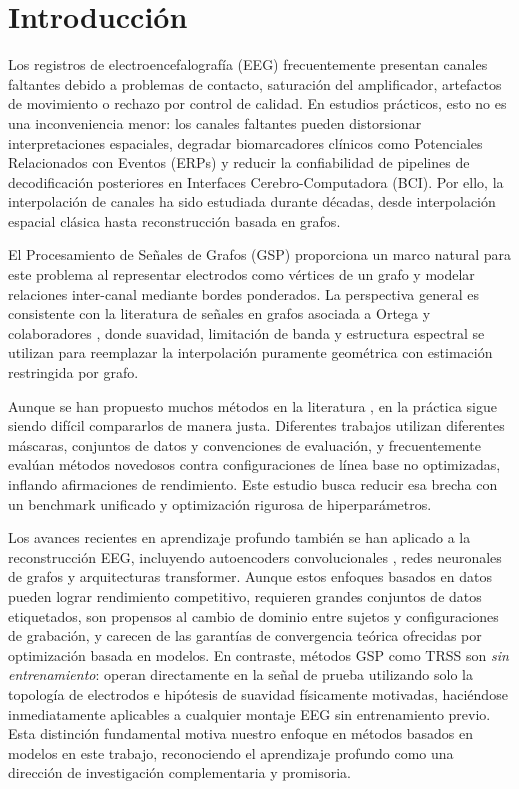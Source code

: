 \section{Introducción}

Los registros de electroencefalografía (EEG) frecuentemente presentan canales faltantes debido a problemas de contacto, saturación del amplificador, artefactos de movimiento o rechazo por control de calidad. En estudios prácticos, esto no es una inconveniencia menor: los canales faltantes pueden distorsionar interpretaciones espaciales, degradar biomarcadores clínicos como Potenciales Relacionados con Eventos (ERPs) y reducir la confiabilidad de pipelines de decodificación posteriores en Interfaces Cerebro-Computadora (BCI). Por ello, la interpolación de canales ha sido estudiada durante décadas, desde interpolación espacial clásica hasta reconstrucción basada en grafos.

El Procesamiento de Señales de Grafos (GSP) proporciona un marco natural para este problema al representar electrodos como vértices de un grafo y modelar relaciones inter-canal mediante bordes ponderados. La perspectiva general es consistente con la literatura de señales en grafos asociada a Ortega y colaboradores \cite{shuman2013,ortega2018}, donde suavidad, limitación de banda y estructura espectral se utilizan para reemplazar la interpolación puramente geométrica con estimación restringida por grafo.

Aunque se han propuesto muchos métodos en la literatura \cite{narang2013,puy2018,zhang2024bgsrp}, en la práctica sigue siendo difícil compararlos de manera justa. Diferentes trabajos utilizan diferentes máscaras, conjuntos de datos y convenciones de evaluación, y frecuentemente evalúan métodos novedosos contra configuraciones de línea base no optimizadas, inflando afirmaciones de rendimiento. Este estudio busca reducir esa brecha con un benchmark unificado y optimización rigurosa de hiperparámetros.

Los avances recientes en aprendizaje profundo también se han aplicado a la reconstrucción EEG, incluyendo autoencoders convolucionales \cite{banville2021uncovering}, redes neuronales de grafos \cite{defferrard2016} y arquitecturas transformer. Aunque estos enfoques basados en datos pueden lograr rendimiento competitivo, requieren grandes conjuntos de datos etiquetados, son propensos al cambio de dominio entre sujetos y configuraciones de grabación, y carecen de las garantías de convergencia teórica ofrecidas por optimización basada en modelos. En contraste, métodos GSP como TRSS son \emph{sin entrenamiento}: operan directamente en la señal de prueba utilizando solo la topología de electrodos e hipótesis de suavidad físicamente motivadas, haciéndose inmediatamente aplicables a cualquier montaje EEG sin entrenamiento previo. Esta distinción fundamental motiva nuestro enfoque en métodos basados en modelos en este trabajo, reconociendo el aprendizaje profundo como una dirección de investigación complementaria y promisoria.

